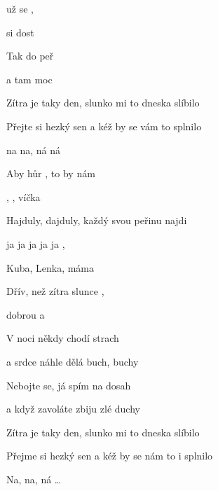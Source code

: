 

\zs
{} už se ,

 si dost  

Tak  do peř

a  tam moc 
\ks

\zs
Zítra je taky den, slunko mi to dneska slíbilo

Přejte si hezký sen a kéž by se vám to splnilo

 na na,  ná  ná 

Aby hůr , to by nám 
\ks

\zr
{}, ,  víčka  

Hajduly, dajduly, každý svou peřinu najdi

 ja ja ja ja ja ,

Kuba, Lenka, máma  

Dřív, než zítra slunce  ,

dobrou  a 
\kr

\zs
V noci někdy chodí strach

a srdce náhle dělá buch, buchy

Nebojte se, já spím na dosah

a když zavoláte zbiju zlé duchy
\ks

\zr
Zítra je taky den, slunko mi to dneska slíbilo

Přejme si hezký sen a kéž by se nám to i splnilo

Na, na, ná …
\kr

\kp





